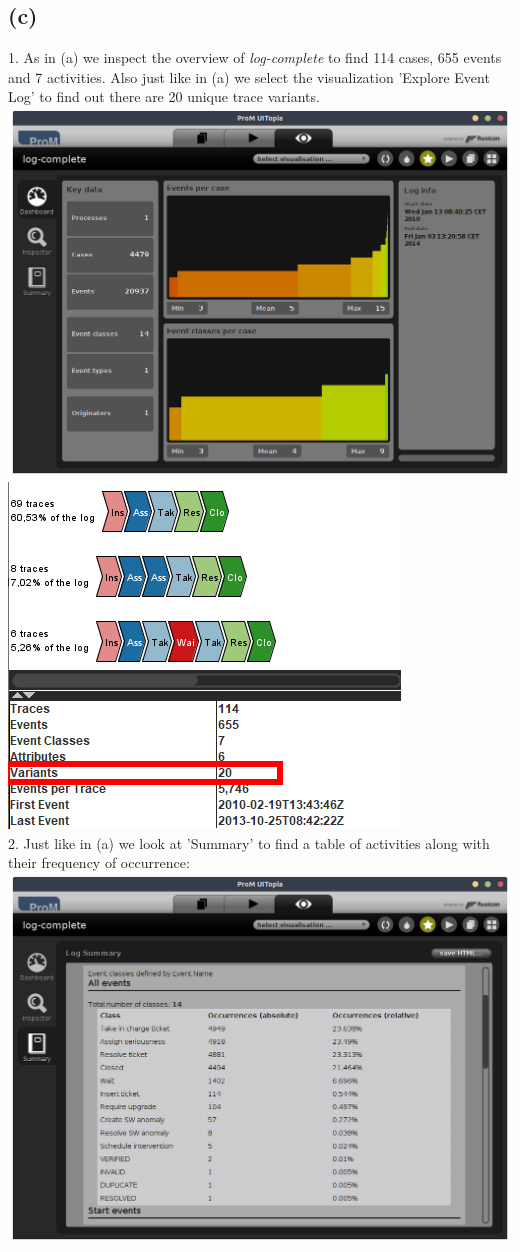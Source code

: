 \documentclass[../../main.tex]{subfiles}
\begin{document}
\subsection*{(c)}
1. As in (a) we inspect the overview of \textit{log-complete} to find 114 cases, 655 events and 7 activities. Also just like in (a) we select the visualization 'Explore Event Log' to find out there are 20 unique trace variants.\\ 
\includegraphics[width=0.6\columnwidth]{img/ProM_c_overview.png}
\includegraphics[width=0.4\columnwidth]{img/ProM_c_traces.png}\\
2. Just like in (a) we look at 'Summary' to find a table of activities along with their frequency of occurrence:\\
\includegraphics[width=0.8\columnwidth]{img/ProM_c_summary.png}
\end{document}
